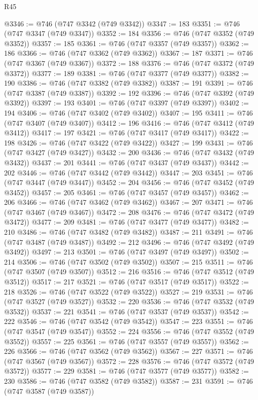 \begin{lexlean}{R45}
\begin{coremodule}
@3346 := @746 (@747 @3342 (@749 @3342))
@3347 := 183
@3351 := @746 (@747 @3347 (@749 @3347))
@3352 := 184
@3356 := @746 (@747 @3352 (@749 @3352))
@3357 := 185
@3361 := @746 (@747 @3357 (@749 @3357))
@3362 := 186
@3366 := @746 (@747 @3362 (@749 @3362))
@3367 := 187
@3371 := @746 (@747 @3367 (@749 @3367))
@3372 := 188
@3376 := @746 (@747 @3372 (@749 @3372))
@3377 := 189
@3381 := @746 (@747 @3377 (@749 @3377))
@3382 := 190
@3386 := @746 (@747 @3382 (@749 @3382))
@3387 := 191
@3391 := @746 (@747 @3387 (@749 @3387))
@3392 := 192
@3396 := @746 (@747 @3392 (@749 @3392))
@3397 := 193
@3401 := @746 (@747 @3397 (@749 @3397))
@3402 := 194
@3406 := @746 (@747 @3402 (@749 @3402))
@3407 := 195
@3411 := @746 (@747 @3407 (@749 @3407))
@3412 := 196
@3416 := @746 (@747 @3412 (@749 @3412))
@3417 := 197
@3421 := @746 (@747 @3417 (@749 @3417))
@3422 := 198
@3426 := @746 (@747 @3422 (@749 @3422))
@3427 := 199
@3431 := @746 (@747 @3427 (@749 @3427))
@3432 := 200
@3436 := @746 (@747 @3432 (@749 @3432))
@3437 := 201
@3441 := @746 (@747 @3437 (@749 @3437))
@3442 := 202
@3446 := @746 (@747 @3442 (@749 @3442))
@3447 := 203
@3451 := @746 (@747 @3447 (@749 @3447))
@3452 := 204
@3456 := @746 (@747 @3452 (@749 @3452))
@3457 := 205
@3461 := @746 (@747 @3457 (@749 @3457))
@3462 := 206
@3466 := @746 (@747 @3462 (@749 @3462))
@3467 := 207
@3471 := @746 (@747 @3467 (@749 @3467))
@3472 := 208
@3476 := @746 (@747 @3472 (@749 @3472))
@3477 := 209
@3481 := @746 (@747 @3477 (@749 @3477))
@3482 := 210
@3486 := @746 (@747 @3482 (@749 @3482))
@3487 := 211
@3491 := @746 (@747 @3487 (@749 @3487))
@3492 := 212
@3496 := @746 (@747 @3492 (@749 @3492))
@3497 := 213
@3501 := @746 (@747 @3497 (@749 @3497))
@3502 := 214
@3506 := @746 (@747 @3502 (@749 @3502))
@3507 := 215
@3511 := @746 (@747 @3507 (@749 @3507))
@3512 := 216
@3516 := @746 (@747 @3512 (@749 @3512))
@3517 := 217
@3521 := @746 (@747 @3517 (@749 @3517))
@3522 := 218
@3526 := @746 (@747 @3522 (@749 @3522))
@3527 := 219
@3531 := @746 (@747 @3527 (@749 @3527))
@3532 := 220
@3536 := @746 (@747 @3532 (@749 @3532))
@3537 := 221
@3541 := @746 (@747 @3537 (@749 @3537))
@3542 := 222
@3546 := @746 (@747 @3542 (@749 @3542))
@3547 := 223
@3551 := @746 (@747 @3547 (@749 @3547))
@3552 := 224
@3556 := @746 (@747 @3552 (@749 @3552))
@3557 := 225
@3561 := @746 (@747 @3557 (@749 @3557))
@3562 := 226
@3566 := @746 (@747 @3562 (@749 @3562))
@3567 := 227
@3571 := @746 (@747 @3567 (@749 @3567))
@3572 := 228
@3576 := @746 (@747 @3572 (@749 @3572))
@3577 := 229
@3581 := @746 (@747 @3577 (@749 @3577))
@3582 := 230
@3586 := @746 (@747 @3582 (@749 @3582))
@3587 := 231
@3591 := @746 (@747 @3587 (@749 @3587))

\end{coremodule}
\end{lexlean}
